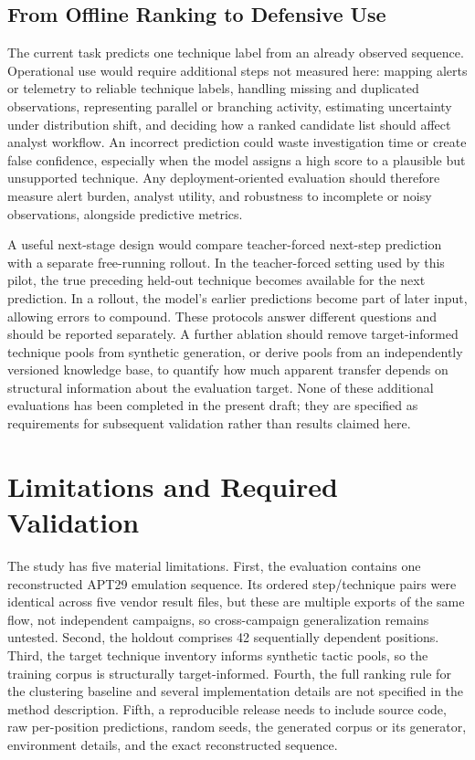 \documentclass[conference]{IEEEtran}
\begin{document}
\subsection{From Offline Ranking to Defensive Use}
The current task predicts one technique label from an already observed sequence. Operational use would require additional steps not measured here: mapping alerts or telemetry to reliable technique labels, handling missing and duplicated observations, representing parallel or branching activity, estimating uncertainty under distribution shift, and deciding how a ranked candidate list should affect analyst workflow. An incorrect prediction could waste investigation time or create false confidence, especially when the model assigns a high score to a plausible but unsupported technique. Any deployment-oriented evaluation should therefore measure alert burden, analyst utility, and robustness to incomplete or noisy observations, alongside predictive metrics.

A useful next-stage design would compare teacher-forced next-step prediction with a separate free-running rollout. In the teacher-forced setting used by this pilot, the true preceding held-out technique becomes available for the next prediction. In a rollout, the model's earlier predictions become part of later input, allowing errors to compound. These protocols answer different questions and should be reported separately. A further ablation should remove target-informed technique pools from synthetic generation, or derive pools from an independently versioned knowledge base, to quantify how much apparent transfer depends on structural information about the evaluation target. None of these additional evaluations has been completed in the present draft; they are specified as requirements for subsequent validation rather than results claimed here.

\section{Limitations and Required Validation}
The study has five material limitations. First, the evaluation contains one reconstructed APT29 emulation sequence. Its ordered step/technique pairs were identical across five vendor result files, but these are multiple exports of the same flow, not independent campaigns, so cross-campaign generalization remains untested. Second, the holdout comprises 42 sequentially dependent positions. Third, the target technique inventory informs synthetic tactic pools, so the training corpus is structurally target-informed. Fourth, the full ranking rule for the clustering baseline and several implementation details are not specified in the method description. Fifth, a reproducible release needs to include source code, raw per-position predictions, random seeds, the generated corpus or its generator, environment details, and the exact reconstructed sequence.
\end{document}
